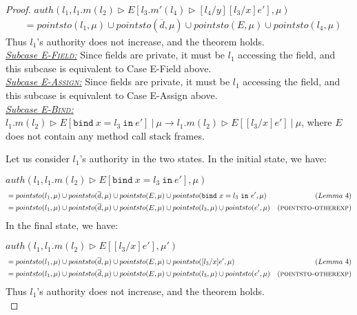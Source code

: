 \documentclass{llncs}
\newcommand{\keywadj}[1]{\mathtt{#1}}
\newcommand{\keyw}[1]{\keywadj{#1}~}
\begin{document}
\begin{proof}
\noindent$auth(l_1, l_1.m(l_2) \rhd E[l_3.m'(l_4) \rhd [l_4/y] [l_3/x] e'], \mu)$
\vspace{-7pt}
\begin{align*}
&= pointsto(l_1, \mu) \cup pointsto(\overline{d}, \mu) \cup pointsto(E, \mu) \cup pointsto(l_4, \mu)
\end{align*}
Thus $l_1$'s authority does not increase, and the theorem holds.\\

\noindent\underline{\textit{Subcase \textsc{E-Field}:}}
Since fields are private, it must be $l_1$ accessing the field, and this subcase is equivalent to Case E-Field above.\\

\noindent\underline{\textit{Subcase \textsc{E-Assign}:}}
Since fields are private, it must be $l_1$ accessing the field, and this subcase is equivalent to Case E-Assign above.\\

\noindent\underline{\textit{Subcase \textsc{E-Bind}:}}
$l_1.m(l_2) \rhd E[\keyw{bind} x = l_3~\keyw{in} e']~|~\mu \longrightarrow l_1.m(l_2) \rhd E[[l_3/x] e']~|~\mu$, where $E$ does not contain any method call stack frames.

\noindent Let us consider $l_1$'s authority in the two states. In the initial state, we have:

\noindent$auth(l_1, l_1.m(l_2) \rhd E[\keyw{bind} x = l_3~\keyw{in} e'], \mu)$
\vspace{-7pt}
\begin{align*}
&= pointsto(l_1, \mu) \cup pointsto(\overline{d}, \mu) \cup pointsto(E, \mu) \cup pointsto(\keyw{bind} x = l_3~\keyw{in} e', \mu) & (Lemma~4)\\
&= pointsto(l_1, \mu) \cup pointsto(\overline{d}, \mu) \cup pointsto(E, \mu) \cup pointsto(l_3, \mu) \cup pointsto(e', \mu) & (\textsc{pointsto-otherexp})
\end{align*}
In the final state, we have:

\noindent$auth(l_1, l_1.m(l_2) \rhd E[[l_3/x] e'], \mu')$
\vspace{-7pt}
\begin{align*}
&= pointsto(l_1, \mu) \cup pointsto(\overline{d}, \mu) \cup pointsto(E, \mu) \cup pointsto([l_3/x] e', \mu) & (Lemma~4)\\
&= pointsto(l_1, \mu) \cup pointsto(\overline{d}, \mu) \cup pointsto(E, \mu) \cup pointsto(l_3, \mu) \cup pointsto(e', \mu) & (\textsc{pointsto-otherexp})
\end{align*}
Thus $l_1$'s authority does not increase, and the theorem holds.\\


\end{proof}
\end{document}

